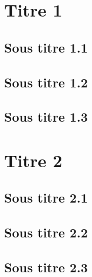 \documentclass[11pt,fleqn]{book} %
\begin{document}
\section{Titre 1}
\subsection{Sous titre 1.1}
\lipsum[1-2]
\subsection{Sous titre 1.2}
\lipsum[1-2]
\subsection{Sous titre 1.3}
\lipsum[1-2]
\section{Titre 2}
\subsection{Sous titre 2.1}
\subsection{Sous titre 2.2}
\subsection{Sous titre 2.3}
\end{document}
